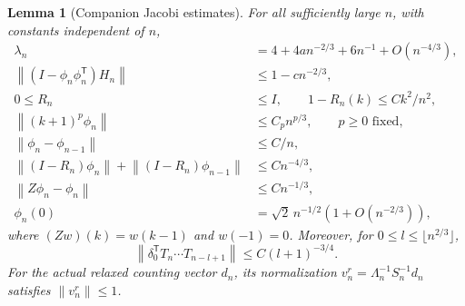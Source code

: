 \documentclass[11pt,letterpaper]{article}
\numberwithin{equation}{section}
\newtheorem{lemma}[theorem]{Lemma}
\theoremstyle{remark}
\newcommand{\norm}[1]{\left\lVert#1\right\rVert}
\begin{document}
\begin{lemma}[Companion Jacobi estimates]\label{air:jp:cb:lem:import}
For all sufficiently large $n$, with constants independent of $n$,
\begin{align}
 \lambda_n&=4+4an^{-2/3}+6n^{-1}+O(n^{-4/3}),\label{air:jp:cb:eq:lambda}\\
 \norm{(I-\phi_n\phi_n^{\mathsf T})H_n}&\le1-cn^{-2/3},\label{air:jp:cb:eq:gap}\\
 0\le R_n&\le I,\qquad 1-R_n(k)\le Ck^2/n^2,\label{air:jp:cb:eq:Rbound}\\
 \norm{(k+1)^p\phi_n}&\le C_p n^{p/3},\qquad p\ge0\text{ fixed},\label{air:jp:cb:eq:moment}\\
 \norm{\phi_n-\phi_{n-1}}&\le C/n,\label{air:jp:cb:eq:drift}\\
 \norm{(I-R_n)\phi_n}+\norm{(I-R_n)\phi_{n-1}}&\le Cn^{-4/3},\label{air:jp:cb:eq:gauge}\\
 \norm{Z\phi_n-\phi_n}&\le Cn^{-1/3},\label{air:jp:cb:eq:shift}\\
 \phi_n(0)&=\sqrt2\,n^{-1/2}(1+O(n^{-2/3})),\label{air:jp:cb:eq:phiboundary}
\end{align}
where $(Zw)(k)=w(k-1)$ and $w(-1)=0$. Moreover, for $0\le l\le\lfloor n^{2/3}\rfloor$,
\begin{equation}\label{air:jp:cb:eq:smooth}
 \norm{\delta_0^{\mathsf T}T_n\cdots T_{n-l+1}}\le C(l+1)^{-3/4}.
\end{equation}
For the actual relaxed counting vector $d_n$, its normalization
$v_n^r=\Lambda_n^{-1}S_n^{-1}d_n$ satisfies $\norm{v_n^r}\le1$.
\end{lemma}
\end{document}
